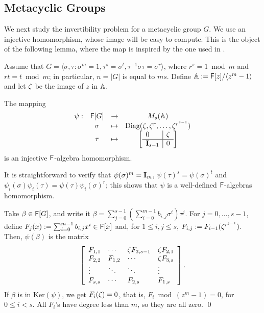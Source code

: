 \subsection{Metacyclic Groups}

We next study the invertibility problem for a
metacyclic group $G$. We use an injective homomorphism, whose image will
be easy to compute. This is the object of the following lemma, where
the map is inspired by the one used in \cite[\S 47]{Curtis}.

Assume that $G = \langle \sigma , \tau : \sigma^m = 1, \tau^s =
\sigma^t, \tau^{-1} \sigma \tau = \sigma^r \rangle$, where $r^s = 1
\bmod m$ and $rt = t \bmod m$; in particular, $n=|G|$ is equal to
$ms$. Define $\mathbb{A}:={\mathsf{F}}[z]/\langle z^m-1\rangle$ and let $\zeta$ be the
image of $z$ in $\mathbb{A}$.

\begin{lemma}\label{prop:metinjection}
The mapping 
\[
  \begin{array}{cccc}
\psi:& \F [G]& \to& M_s(\A) \\
&\sigma &\mapsto& \mathrm{Diag}(\zbar, \zbar^r , \ldots, \zbar^{r^{s-1}})\\
&\tau &\mapsto &
\left[ \begin{array}{l|l}
0 & \zbar\\
\hline
\mat I_{s-1} & 0
\end{array}
\right]
  \end{array}
\]
is an injective ${\mathsf{F}}$-algebra homomorphism.
\end{lemma}
It is straightforward to verify that $\psi(\sigma)^m = \mat I_m$,
$\psi(\tau)^s = \psi(\sigma)^t$ and $\psi_i(\sigma) \psi_i(\tau)
=\psi(\tau) \psi_i(\sigma)^r$; this shows that $\psi$ is a well-defined ${\mathsf{F}}$-algebras homomorphism.

Take $\beta \in {\mathsf{F}}[G]$, and write it $\beta = \sum_{j = 0}^{s-1}
\left( \sum_{i = 0}^{m-1} b_{i,j} \sigma^i \right) \tau^j$. For
$j=0,\dots,s-1$, define $F_j(x) := \sum_{i = 0}^{m-1} b_{i,j}x^i \in
{\mathsf{F}}[x]$ and, for $1 \leq i,j \leq s$,
$F_{i,j} := F_{i-1}(\zeta^{r^{j-1}}).$
Then, $\psi(\beta)$ is the matrix
\begin{equation}\label{eq:injection}
\left[\begin{array}{llll}
F_{1,1} &  \cdots	&	\zeta F_{3,s-1} & \zeta F_{2,1}\\
F_{2,2} & F_{1,2}& \cdots & \zeta F_{3,s}\\
\vdots &\ddots & \ddots& \vdots\\
F_{s,s}& \cdots & F_{2,s}	& F_{1,s}
\end{array}
\right].
\end{equation}
If $\beta$ is in $\mathrm{Ker}(\psi)$, we get $F_i(\zeta) =0$, that is,
$F_i \bmod (z^m-1)=0$, for $0 \leq i < s$.  All $F_i$'s have degree 
less than $m$, so they are all zero. \qed


